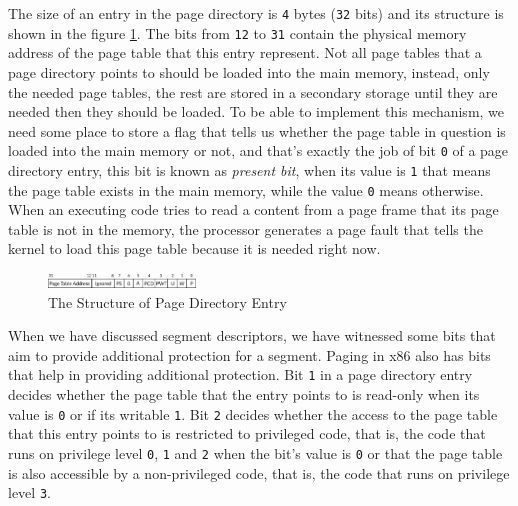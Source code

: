 The size of an entry in the page directory is \lstinline!4! bytes
(\lstinline!32! bits) and its structure is shown in the figure
\ref{fig:10102021_0}. The bits from \lstinline!12! to \lstinline!31!
contain the physical memory address of the page table that this entry
represent. Not all page tables that a page directory points to should be
loaded into the main memory, instead, only the needed page tables, the
rest are stored in a secondary storage until they are needed then they
should be loaded. To be able to implement this mechanism, we need some
place to store a flag that tells us whether the page table in question
is loaded into the main memory or not, and that's exactly the job of bit
\lstinline!0! of a page directory entry, this bit is known as
\emph{present bit}, when its value is \lstinline!1! that means the page
table exists in the main memory, while the value \lstinline!0! means
otherwise. When an executing code tries to read a content from a page
frame that its page table is not in the memory, the processor generates
a page fault that tells the kernel to load this page table because it is
needed right now.

\begin{figure}
\centering
\includegraphics[width=0.35000\textwidth]{Figures/memory-ch/Fig10102021_0.png}
\caption{The Structure of Page Directory Entry}\label{fig:10102021_0}
\end{figure}

When we have discussed segment descriptors, we have witnessed some bits
that aim to provide additional protection for a segment. Paging in x86
also has bits that help in providing additional protection. Bit
\lstinline!1! in a page directory entry decides whether the page table
that the entry points to is read-only when its value is \lstinline!0! or
if its writable \lstinline!1!. Bit \lstinline!2! decides whether the
access to the page table that this entry points to is restricted to
privileged code, that is, the code that runs on privilege level
\lstinline!0!, \lstinline!1! and \lstinline!2! when the bit's value is
\lstinline!0! or that the page table is also accessible by a
non-privileged code, that is, the code that runs on privilege level
\lstinline!3!.

